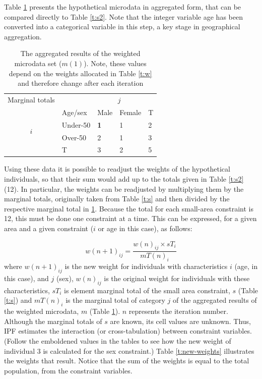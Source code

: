 \documentclass[a4paper,10pt]{article}
\begin{document}
Table \ref{t:m} presents the
hypothetical microdata in aggregated form,
that can be compared directly to Table \ref{t:s2}.
Note that the integer variable age has been converted into
a categorical variable in this step, a key stage in geographical aggregation.

\begin{table}[htbp]
\centering
\caption[The aggregated results of the weighted
microdata set]{The aggregated results of the weighted
microdata set ($m(1)$).
Note, these values depend on the
weights allocated in Table \ref{t:w} and therefore
 change after each iteration}

\begin{tabular}{cllll}\toprule
Marginal totals&  & \multicolumn{2}{c}{$j$} & \\
& Age/sex & Male & Female & T\\ \midrule
\multirow{2}{*}{$i$} & Under-50 & \textbf{1} & 1 & 2\\
& Over-50 & 2 & 1 &3 \\
& T & 3 & 2 &5\\
\bottomrule
\end{tabular}
\label{t:m}
\end{table}

Using these data it is possible to readjust the weights of the hypothetical
individuals, so that their sum would add up to the totals given in Table
\ref{t:s2} (12). In particular, the weights can be readjusted by multiplying them by
the marginal totals, originally taken from
Table \ref{t:s} and then divided by the respective marginal total in \ref{t:m}.
Because the total for each small-area constraint is 12, this must be
done one constraint at a time. This
can be expressed, for a given area and a given constraint ($i$
or age in this case), as follows:

\begin{equation}
w(n+1)_{ij} = \frac{w(n)_{ij} \times sT_{i}}{mT(n)_{i}}
\label{eq:ipf}
\end{equation}
where $w(n+1)_{ij}$ is the new weight for individuals with characteristics $i$
(age, in this case), and $j$ (sex),  $w(n)_{ij}$ is the original
weight for individuals with these characteristics, $sT_{i}$ is element
marginal total of the small area constraint, $s$
(Table \ref{t:s}) and $mT(n)_{i}$ is the marginal total of category
$j$ of the aggregated results of the weighted
microdata, $m$ (Table \ref{t:m}). $n$ represents the iteration number.
Although the marginal totals of $s$ are known, its cell values
are unknown. Thus, IPF estimates the interaction (or cross-tabulation)
between constraint variables.
(Follow the emboldened values in the tables
to see how the new weight of individual 3 is calculated for the sex constraint.)
Table \ref{t:new-weights} illustrates the weights that result. Notice that the
sum of the weights is equal to the total population, from the constraint variables.
\end{document}
